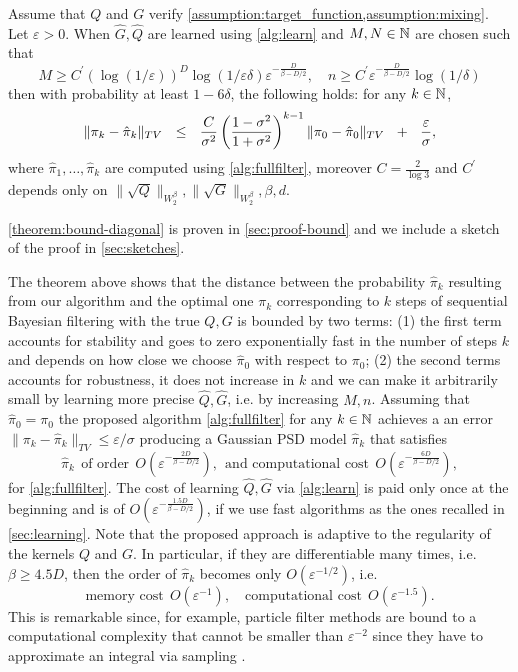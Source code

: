 \begin{theorem}\label{theorem:bound-diagonal}
Assume that $Q$ and $G$ verify \cref{assumption:target_function,assumption:mixing}. Let $\varepsilon > 0$.
When $\hat{G}, \hat{Q}$ are learned using \cref{alg:learn} and $M, N \in \mathbb N$ are chosen such that
%
$$M \geq C^\prime(\log\left(1/\varepsilon\right))^D\log\left(1/\varepsilon\delta\right)\varepsilon^{-\frac{D}{\beta - D/2}}, \quad n \geq C^\prime \varepsilon^{-\frac{D}{\beta - D/2}}\log (1/\delta)$$
%
then with probability at least $1-6\delta$, the following holds: for any $k \in \mathbb N$,
\begin{align}
    \Vert \pi_k - \hat\pi_k\Vert_{TV} ~~\leq~~ \frac{C}{\sigma^2}\left(\frac{1-\sigma^2}{1 + \sigma^2}\right)^{k-1}\|\pi_0 - \hat{\pi}_0\|_{TV} ~~+~~ \frac{\varepsilon}{\sigma},
\end{align}
where $\hat{\pi}_1,\dots, \hat{\pi}_k$ are computed using \cref{alg:fullfilter}, moreover $C=\frac{2}{\log 3}$ and $C^\prime$ depends only on $\|\sqrt{Q}\|_{W^\beta_2}, \|\sqrt{G}\|_{W^\beta_2}, \beta, d$.
\end{theorem}
\cref{theorem:bound-diagonal} is proven in \cref{sec:proof-bound} and we include a sketch of the proof in \cref{sec:sketches}.

The theorem above shows that the distance between the probability $\hat \pi_k$ resulting from our algorithm and the optimal one $\pi_k$ corresponding to $k$ steps of sequential Bayesian filtering with the true $Q, G$ is bounded by two terms: (1)
the first term accounts for stability and goes to zero exponentially fast in the number of steps $k$ and depends on how close we choose $\hat{\pi}_0$ with respect to $\pi_0$; (2) the second terms accounts for robustness, it does not increase in $k$ and we can make it arbitrarily small by learning more precise $\hat{Q}, \hat{G}$, i.e. by increasing $M, n$. Assuming that $\hat{\pi}_0 = \pi_0$ the proposed algorithm \cref{alg:fullfilter} for any $k \in\mathbb N$ achieves a
an error $\|\pi_k - \hat{\pi}_k\|_{TV} \leq \varepsilon/\sigma$ producing a Gaussian PSD model $\hat{\pi}_k$ that satisfies
$$ \hat{\pi}_k ~~\textrm{of order}~~  O(\varepsilon^{-\frac{2D}{\beta - D/2}}), ~~\textrm{and computational cost} ~~ O(\varepsilon^{-\frac{6D}{\beta - D/2}}),$$
for \cref{alg:fullfilter}. The cost of learning $\hat{Q}, \hat{G}$ via \cref{alg:learn} is paid only once at the beginning and is of $O(\varepsilon^{-\frac{1.5D}{\beta - D/2}})$, if we use fast algorithms as the ones recalled in \cref{sec:learning}. Note that the proposed approach is adaptive to the regularity of the kernels $Q$ and $G$. In particular, if they are differentiable many times, i.e. $\beta \geq 4.5 D$, then the order of $\hat{\pi}_k$ becomes only  $O(\varepsilon^{-1/2})$, i.e.
$$
\textrm{memory cost} ~~ O(\varepsilon^{-1}), \quad \textrm{computational cost} ~~ O(\varepsilon^{-1.5}).
$$
%
This is remarkable since, for example, particle filter methods are bound to a computational complexity that cannot be smaller than $\varepsilon^{-2}$ since they have to approximate an integral via sampling \citep{oudjane}.

